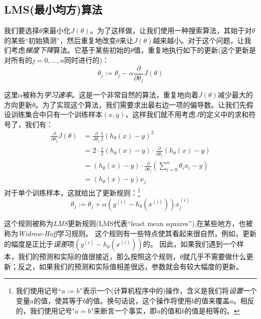 \documentclass[hyperref, UTF8]{ctexart}
\begin{document}
\subsection{LMS(最小均方)算法}
我们要选择$\theta$来最小化$J(\theta)$。为了这样做，让我们使用一种搜索算法，其始于对$\theta$的某些“初始猜测”，然后重复地改变$\theta$来让$J(\theta)$越来越小。对于这个问题，让我们考虑\emph{梯度下降}算法。它基于某些初始的$\theta$值，重复地执行如下的更新(这个更新是对所有的$j = 0,\dots,n$同时进行的)：
\begin{equation*}
\theta_j := \theta_j - \alpha\frac{\partial}{\partial\theta_j}J(\theta)
\end{equation*}

这里$\alpha$被称为\emph{学习速率}。这是一个非常自然的算法，重复地向着$J(\theta)$减少最大的方向更新$\theta$。为了实现这个算法，我们需要求出最右边一项的偏导数。让我们先假设训练集合中只有一个训练样本$(x, y)$，这样我们就不用考虑$J$的定义中的求和符号了，我们有：
\begin{equation}
\begin{split}
\frac{\partial}{\partial\theta_j}J(\theta) &= \frac{\partial}{\partial\theta_j}\frac{1}{2}(h_\theta(x) - y)^2 \\
&= 2\cdot\frac{1}{2}(h_\theta(x) - y)\cdot\frac{\partial}{\partial\theta_j}(h_\theta(x) - y) \\
&= (h_\theta(x) - y)\cdot\frac{\partial}{\partial\theta_j}(\sum_{i = 0}^n\theta_ix_i - y) \\
&= (h_\theta(x) - y)x_j
\end{split}
\end{equation}
对于单个训练样本，这就给出了更新规则：\footnote{我们使用记号“$a := b$”表示一个(计算机程序中的)操作，含义是我们将\emph{设置}一个变量$a$的值，使其等于$b$的值。换句话说，这个操作将使用$b$的值来覆盖$a$。相反的，我们使用记号"$a = b$"来断言一个事实，即$a$的值和$b$的值是相等的。}
\begin{equation*}
\theta_j := \theta_j + \alpha(y^{(i)} - h_\theta(x^{(i)}))x^{(i)}_j
\end{equation*}

这个规则被称为\emph{LMS}更新规则(LMS代表``least mean squares''),在某些地方，也被称为\emph{Widrow-Hoff}学习规则。
这个规则有一些特点使其看起来很自然，例如，更新的幅度是正比于\emph{误差}项$(y^{(i)} - h_\theta(x^{(i)}))$的。
因此，如果我们遇到一个样本，我们的预测和实际的值很接近，那么按照这个规则，$\theta$就几乎不需要做什么更新；反之，如果我们的预测和实际值相差很远，参数就会有较大幅度的更新。
\end{document}
